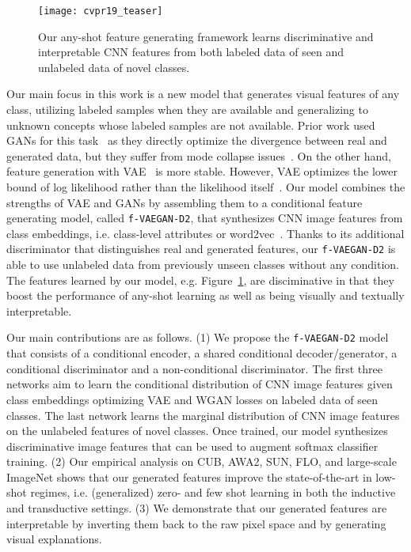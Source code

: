 \documentclass[10pt,twocolumn,letterpaper]{article}
\begin{document}
\begin{figure}[t]
	\centering
        \texttt{[image: cvpr19\_teaser]}
        \vspace{-5mm}
	\caption{Our any-shot feature generating framework learns discriminative and interpretable CNN features from both labeled data of seen and unlabeled data of novel classes. }
	 \vspace{-3mm}
	\label{fig:teaser}
\end{figure}
 
Our main focus in this work is a new model that generates visual features of any class, utilizing labeled samples when they are available and generalizing to unknown concepts whose labeled samples are not available. Prior work used GANs for this task~\cite{XLSA18,FKRC18} as they directly optimize the divergence between real and generated data, but they suffer from mode collapse issues~\cite{arjovsky2017towards}. On the other hand, feature generation with VAE~\cite{Verma_2018_CVPR} is more stable. However, VAE optimizes the lower bound of log likelihood rather than the likelihood itself~\cite{kingma2013auto}. Our model combines the strengths of VAE and GANs by assembling them to a conditional feature generating model, called \texttt{f-VAEGAN-D2}, that synthesizes CNN image features from class embeddings, i.e. class-level attributes or word2vec~\cite{MSCCD13}. Thanks to its additional discriminator that distinguishes real and generated features, our \texttt{f-VAEGAN-D2} is able to use unlabeled data from previously unseen classes without any condition. 
The features learned by our model, e.g. Figure~\ref{fig:teaser}, are disciminative in that they boost the performance of any-shot learning as well as being visually and textually interpretable.


Our main contributions are as follows. (1) We propose the \texttt{f-VAEGAN-D2} model that consists of a conditional encoder, a shared conditional decoder/generator, a conditional discriminator and a non-conditional discriminator. The first three networks aim to learn the conditional distribution of CNN image features given class embeddings optimizing VAE and WGAN losses on labeled data of seen classes. The last network learns the marginal distribution of CNN image features on the unlabeled features of novel classes. Once trained, our model synthesizes discriminative image features that can be used to augment softmax classifier training. (2) Our empirical analysis on CUB, AWA2, SUN, FLO, and large-scale ImageNet shows that our generated features improve the state-of-the-art in low-shot regimes, i.e. (generalized) zero- and few shot learning in both the inductive and transductive settings. (3) We demonstrate that our generated features are interpretable by inverting them back to the raw pixel space and by generating visual explanations.  
\end{document}
